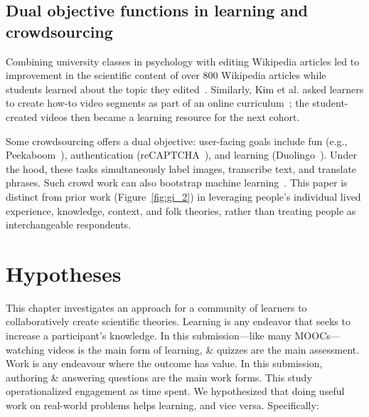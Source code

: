 
\subsection{Dual objective functions in learning and crowdsourcing}
Combining university classes in psychology with editing
Wikipedia articles led to improvement in the scientific
content of over 800 Wikipedia articles while students
learned about the topic they edited~\cite{Farzan2013}. Similarly, Kim et
al. asked learners to create how-to video segments as part
of an online curriculum~\cite{Kim2015f}; the student-created videos
then became a learning resource for the next cohort. 

Some crowdsourcing offers a dual objective: user-facing
goals include fun (e.g., Peekaboom~\cite{VonAhn2006}), authentication
(reCAPTCHA~\cite{Ahn2008}), and learning (Duolingo~\cite{Hacker2014}). Under the
hood, these tasks simultaneously label images, transcribe
text, and translate phrases. Such crowd work can also bootstrap machine learning~\cite{Bernstein2012c}. This paper is distinct from prior
work (Figure~\ref{fig:gi_2}) in leveraging people’s individual lived
experience, knowledge, context, and folk theories, rather
than treating people as interchangeable respondents.

\section{Hypotheses}
This chapter investigates an approach for a community of learners to collaboratively create scientific theories. Learning is any endeavor that seeks to increase a participant’s knowledge. In this submission---like many MOOCs---watching videos is the main form of learning, \& quizzes are the main assessment. Work is any endeavour where the outcome has value. In this submission, authoring \& answering questions are the main work forms. This study operationalized engagement as time spent. We hypothesized that doing useful work on real-world problems helps learning, and vice versa. Specifically:

